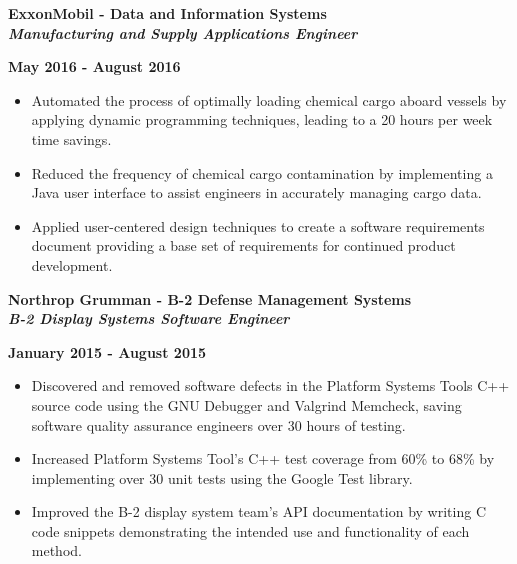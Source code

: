 \documentclass[10pt,letterpaper]{article}
\begin{document}
\medskip

\begin{minipage}[t]{0.53\textwidth}
	\begin{flushleft}
		\textbf{ExxonMobil - Data and Information Systems}\\
		\textbf{\textit{Manufacturing and Supply Applications Engineer}}\\
	\end{flushleft}
\end{minipage}
\begin{minipage}[t]{0.44\textwidth}
	\begin{flushright}
		\textbf{May 2016 - August 2016}
	\end{flushright}
\end{minipage}

\begin{itemize}[noitemsep,topsep=0pt]
	\setlength\itemsep{-0.10em}
	\item Automated the process of optimally loading chemical cargo aboard
	      vessels by applying dynamic programming techniques, leading to a 20
	      hours per week time savings.
	\item Reduced the frequency of chemical cargo contamination by implementing
	      a Java user interface to assist engineers in accurately managing cargo data.
	\item Applied user-centered design techniques to create a software
	      requirements document providing a base set of requirements for continued
	      product development.
\end{itemize}

\medskip

\begin{minipage}[t]{0.53\textwidth}
	\begin{flushleft}
		\textbf{Northrop Grumman - B-2 Defense Management Systems}\\
		\textbf{\textit{B-2 Display Systems Software Engineer}}\\
	\end{flushleft}
\end{minipage}
\begin{minipage}[t]{0.44\textwidth}
	\begin{flushright}
		\textbf{January 2015 - August 2015}
	\end{flushright}
\end{minipage}

\begin{itemize}[noitemsep,topsep=0pt]
	\setlength\itemsep{-0.10em}
	\item Discovered and removed software defects in the
	      Platform Systems Tools C++ source code using the GNU Debugger and Valgrind
	      Memcheck, saving software quality assurance engineers over 30 hours of
	      testing.
	\item Increased Platform Systems Tool's C++ test coverage from 60\% to 68\% by
	      implementing over 30 unit tests using the Google Test library.
	\item Improved the B-2 display system team's API documentation by writing C code
	      snippets demonstrating the intended use and functionality of each method.
\end{itemize}
\end{document}
